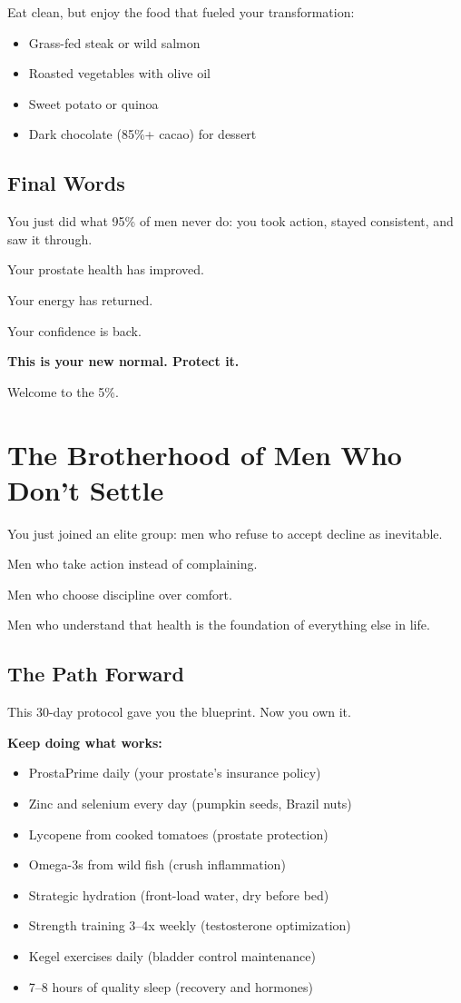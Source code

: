 \documentclass[11pt,oneside]{book}
\begin{document}
Eat clean, but enjoy the food that fueled your transformation:
\begin{itemize}[leftmargin=*]
\item Grass-fed steak or wild salmon
\item Roasted vegetables with olive oil
\item Sweet potato or quinoa
\item Dark chocolate (85\%+ cacao) for dessert
\end{itemize}

\section*{Final Words}

You just did what 95\% of men never do: you took action, stayed consistent, and saw it through.

Your prostate health has improved.

Your energy has returned.

Your confidence is back.

\textbf{This is your new normal. Protect it.}

Welcome to the 5\%.

\clearpage


\chapter*{The Brotherhood of Men Who Don't Settle}

You just joined an elite group: men who refuse to accept decline as inevitable.

Men who take action instead of complaining.

Men who choose discipline over comfort.

Men who understand that health is the foundation of everything else in life.

\section*{The Path Forward}

This 30-day protocol gave you the blueprint. Now you own it.

\textbf{Keep doing what works:}
\begin{itemize}[leftmargin=*]
\item ProstaPrime daily (your prostate's insurance policy)
\item Zinc and selenium every day (pumpkin seeds, Brazil nuts)
\item Lycopene from cooked tomatoes (prostate protection)
\item Omega-3s from wild fish (crush inflammation)
\item Strategic hydration (front-load water, dry before bed)
\item Strength training 3--4x weekly (testosterone optimization)
\item Kegel exercises daily (bladder control maintenance)
\item 7--8 hours of quality sleep (recovery and hormones)
\end{itemize}
\end{document}
